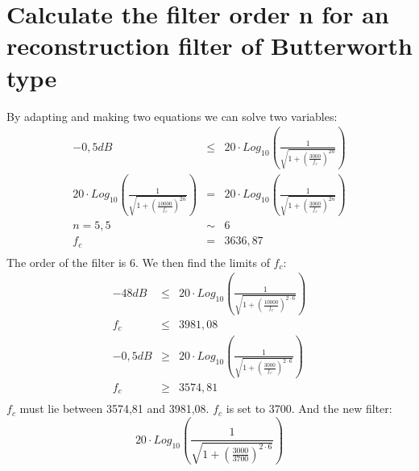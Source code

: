 \documentclass[a4wide,10pt]{article}
\begin{document}
\section{Calculate the filter order n for an reconstruction filter of Butterworth type} %
\label{sec:calculate_the_filter_order_n_for_an_reconstruction_filter_of_butterworth_type}
By adapting and making two equations we can solve two variables:
\begin{eqnarray}
	-0,5dB &\leq& 20 \cdot Log_{10}(\frac{1}{\sqrt{1+(\frac{3000}{f_c})^{2n}}}) \nonumber \\
	20 \cdot Log_{10}(\frac{1}{\sqrt{1+(\frac{10000}{f_c})^{2n}}}) &=& 20 \cdot Log_{10}(\frac{1}{\sqrt{1+(\frac{3000}{f_c})^{2n}}}) \nonumber \\ \nonumber
	n = 5,5 &\sim& 6 \nonumber \\
	f_c &=& 3636,87 \nonumber \\
\end{eqnarray}
The order of the filter is 6.
We then find the limits of $f_c$:
\begin{eqnarray}
	-48dB &\leq& 20 \cdot Log_{10}(\frac{1}{\sqrt{1+(\frac{10000}{f_c})^{2 \cdot 6}}}) \nonumber \\
	f_c &\leq& 3981,08 \nonumber \\
	-0,5dB &\geq& 20 \cdot Log_{10}(\frac{1}{\sqrt{1+(\frac{3000}{f_c})^{2 \cdot 6}}}) \nonumber \\
	f_c &\geq& 3574,81 \nonumber \\
\end{eqnarray}
$f_c$ must lie between 3574,81 and 3981,08. $f_c$ is set to 3700.
And the new filter:
\begin{equation}
	20 \cdot Log_{10}(\frac{1}{\sqrt{1+(\frac{3000}{3700})^{2 \cdot 6}}})
\end{equation}
\end{document}

